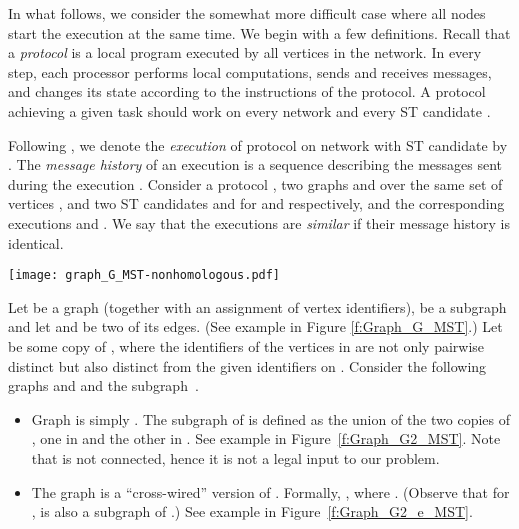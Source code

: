 \documentclass[11pt,letter]{article}
\begin{document}
In what follows, we consider the somewhat more difficult case where 
all nodes start the execution at the same time. 
We begin with a few definitions. Recall that a \textit{protocol} is a local 
program executed by all vertices in the network. 
In every step, each processor performs local computations, 
sends and receives messages, and changes its state according to the 
instructions of the protocol. A protocol achieving a given task should work 
on every network   and every ST candidate .

Following \cite{AGVP_90}, we
denote the {\em execution} of protocol  on network  with 
ST candidate  by  .
The {\em message history} of an execution 
is a sequence
describing the messages sent during the execution .
Consider a protocol , two graphs  and  over the 
same set of vertices , and two ST candidates  and  for  
and  respectively, 
and the corresponding executions  and 
. We say that the executions are {\em similar} 
if their message history is identical.

\begin{figure*}[htb]
\begin{center}
\begin{minipage}{\textwidth}
\centerline{\texttt{[image: graph\_G\_MST-nonhomologous.pdf]}}
\end{minipage}
\caption[]{
\label{f:Graph_G_MST}
\sf Graph  with ST candidate  (the bold edges belong to )}
\end{center}
\end{figure*}

Let  be a graph (together with an assignment 
of vertex identifiers), 
 be a subgraph and let  and  be two of its edges.
(See example in Figure \ref{f:Graph_G_MST}.) 
Let   be some copy of , where the identifiers of 
the vertices in  are not only pairwise distinct but also distinct 
from the given identifiers on . Consider the following graphs 
 and  and the subgraph~. 
\begin{itemize}
\item
 Graph  is simply .
The subgraph  of  is defined as the union of the two copies of , 
one in  and the other in . See example in Figure~\ref{f:Graph_G2_MST}.
Note that  is not connected, hence it is not a legal input to our problem.
\item
The graph  is a ``cross-wired'' version of . 
Formally,
, where 
. 
(Observe that for ,  is also a subgraph of .) 
See example in Figure~\ref{f:Graph_G2_e_MST}.
\end{itemize}
\end{document}

